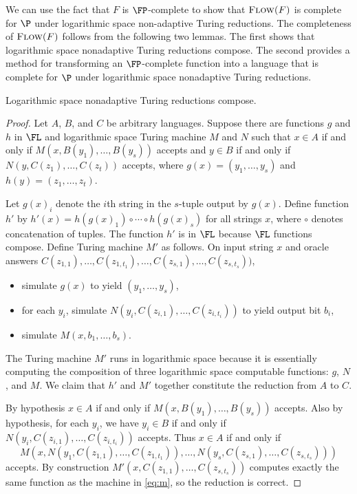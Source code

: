 \documentclass{article}
\newcommand{\Flow}{\textsc{Flow($F$)}}
\begin{document}
We can use the fact that $F$ is $\FP$-complete to show that $\Flow$ is complete for $\P$ under logarithmic space non-adaptive Turing reductions.
The completeness of $\Flow$ follows from the following two lemmas.
The first shows that logarithmic space nonadaptive Turing reductions compose.
The second provides a method for transforming an $\FP$-complete function into a language that is complete for $\P$ under logarithmic space nonadaptive Turing reductions.

\begin{lemma}\label{lem:compose}
  Logarithmic space nonadaptive Turing reductions compose.
\end{lemma}
\begin{proof}
  Let $A$, $B$, and $C$ be arbitrary languages.
  Suppose there are functions $g$ and $h$ in $\FL$ and logarithmic space Turing machine $M$ and $N$ such that $x \in A$ if and only if $M(x, B(y_1), \dotsc, B(y_s))$ accepts and $y \in B$ if and only if $N(y, C(z_1), \dotsc, C(z_t))$ accepts, where $g(x) = (y_1, \dotsc, y_s)$ and $h(y) = (z_1, \dotsc, z_t)$.

  Let $g(x)_i$ denote the $i$th string in the $s$-tuple output by $g(x)$.
  Define function $h'$ by $h'(x) = h(g(x)_1) \circ \dotsb \circ h(g(x)_s)$ for all strings $x$, where $\circ$ denotes concatenation of tuples.
  The function $h'$ is in $\FL$ because $\FL$ functions compose.
  Define Turing machine $M'$ as follows.
  On input string $x$ and oracle answers $C(z_{1, 1}), \dotsc, C(z_{1, t_1}), \dotsc, C(z_{s, 1}), \dotsc, C(z_{s, t_s}))$,
  \begin{itemize}
  \item simulate $g(x)$ to yield $(y_1, \dotsc, y_s)$,
  \item for each $y_i$, simulate $N(y_i, C(z_{i, 1}), \dotsc, C(z_{i, t_i}))$ to yield output bit $b_i$,
  \item simulate $M(x, b_1, \dotsc, b_s)$.
  \end{itemize}
  The Turing machine $M'$ runs in logarithmic space because it is essentially computing the composition of three logarithmic space computable functions: $g$, $N$, and $M$.
  We claim that $h'$ and $M'$ together constitute the reduction from $A$ to $C$.

  By hypothesis $x \in A$ if and only if $M(x, B(y_1), \dotsc, B(y_s))$ accepts.
  Also by hypothesis, for each $y_i$, we have $y_i \in B$ if and only if $N(y_i, C(z_{i, 1}), \dotsc, C(z_{i, t_i}))$ accepts.
  Thus $x \in A$ if and only if
  \begin{equation}\label{eq:m}
    M(x, N(y_1, C(z_{1, 1}), \dotsc, C(z_{1, t_1})), \dotsc, N(y_s, C(z_{s, 1}), \dotsc, C(z_{s, t_s})))
  \end{equation}
  accepts.
  By construction $M'(x, C(z_{1, 1}), \dotsc, C(z_{s, t_s}))$ computes exactly the same function as the machine in \eqref{eq:m}, so the reduction is correct.
\end{proof}
\end{document}

